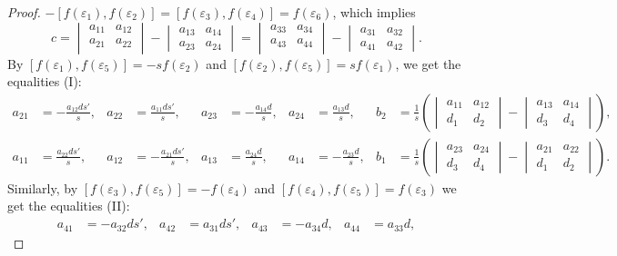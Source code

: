 \documentclass{amsart}
\numberwithin{equation}{section}
\theoremstyle{definition}
\renewcommand{\1}{\mathds{1}}
\renewcommand{\>}{\rightarrow}
\begin{document}
\begin{proof}
$-[f(\varepsilon_1),f(\varepsilon_2)]=[f(\varepsilon_3),f(\varepsilon_4)]=f(\varepsilon_6)$, which implies
\begin{equation}\label{bck_12346}
c= \begin{vmatrix} a_{11} & a_{12} \\ a_{21} & a_{22} \\ \end{vmatrix} - \begin{vmatrix} a_{13} & a_{14} \\ a_{23} & a_{24} \end{vmatrix}
=\begin{vmatrix} a_{33} & a_{34} \\ a_{43} & a_{44} \\ \end{vmatrix} - \begin{vmatrix} a_{31} & a_{32} \\ a_{41} & a_{42} \end{vmatrix}.
\end{equation}
By $[f(\varepsilon_1),f(\varepsilon_5)]=-s f(\varepsilon_2)$ and $[f(\varepsilon_2),f(\varepsilon_5)]=sf(\varepsilon_1)$, we get the equalities (I):
\begin{align*}
a_{21}&=-\frac{a_{12}ds'}{s},& a_{22}&=\frac{a_{11}ds'}{s},& a_{23}&=-\frac{a_{14}d}{s}, & a_{24}&=\frac{a_{13}d}{s},
& b_2&=\frac{1}{s}\left(\begin{vmatrix}a_{11} & a_{12} \\ d_1 & d_2 \end{vmatrix}-\begin{vmatrix}a_{13} & a_{14} \\ d_3 & d_4 \end{vmatrix}\right),\\
a_{11}&=\frac{a_{22}ds'}{s},& a_{12}&=-\frac{a_{21}ds'}{s}, & a_{13}&=\frac{a_{24}d}{s},& a_{14}&=-\frac{a_{23}d}{s},
& b_1&=\frac{1}{s}\left(\begin{vmatrix}a_{23} & a_{24} \\ d_3 & d_4 \end{vmatrix}-\begin{vmatrix}a_{21} & a_{22} \\ d_1 & d_2 \end{vmatrix}\right).
\end{align*}
Similarly, by $[f(\varepsilon_3),f(\varepsilon_5)]=- f(\varepsilon_4)$ and $[f(\varepsilon_4),f(\varepsilon_5)]=f(\varepsilon_3)$ we get
the equalities (II):
\begin{align*}
a_{41}&=-a_{32}ds',& a_{42}&=a_{31}ds',& a_{43}&=-a_{34}d, & a_{44}&=a_{33}d,

\end{align*}
\end{proof}
\end{document}
